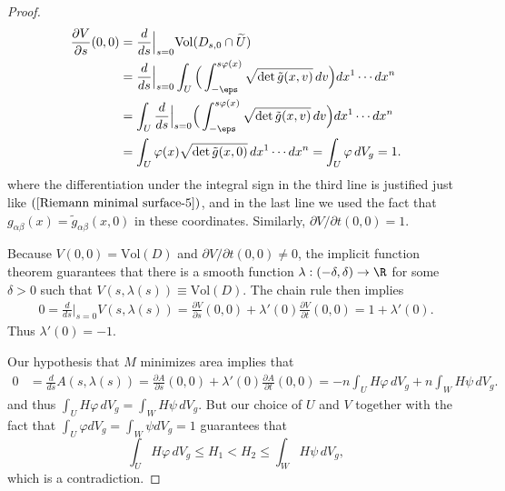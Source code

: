 \begin{proof}
\begin{align*}
\frac{\partial V}{\partial s}(0,0)&=\frac{d}{ds}\Big|_{s=0}\mathrm{Vol}(D_{s,0}\cap\widetilde{U})\\
&=\frac{d}{ds}\Big|_{s=0}\int_U\Big(\int_{-\eps}^{s\varphi(x)}\sqrt{\det\tilde{g}(x,v)}\,dv\Big)dx^1\cdots dx^n\\
&=\int_U\frac{d}{ds}\Big|_{s=0}\Big(\int_{-\eps}^{s\varphi(x)}\sqrt{\det\tilde{g}(x,v)}\,dv\Big)dx^1\cdots dx^n\\
&=\int_U\varphi(x)\sqrt{\det\tilde{g}(x,0)}\,dx^1\cdots dx^n=\int_U\varphi\,dV_g=1.
\end{align*}
where the differentiation under the integral sign in the third line is justified just like $(\ref{Riemann minimal surface-5})$, and in the last line we used the fact that $g_{\alpha\beta}(x)=\tilde{g}_{\alpha\beta}(x,0)$ in these coordinates. Similarly, $\partial V/\partial t(0,0)=1$.\par
Because $V(0,0)=\mathrm{Vol}(D)$ and $\partial V/\partial t(0,0)\neq 0$, the implicit function theorem guarantees that there is a smooth function $\lambda:(-\delta,\delta)\to\R$ for some $\delta>0$ such that $V(s,\lambda(s))\equiv\mathrm{Vol}(D)$. The chain rule then implies
\begin{align*}
0=\frac{d}{ds}\Big|_{s=0}V(s,\lambda(s))=\frac{\partial V}{\partial s}(0,0)+\lambda'(0)\frac{\partial V}{\partial t}(0,0)=1+\lambda'(0).
\end{align*}
Thus $\lambda'(0)=-1$.\par
Our hypothesis that $M$ minimizes area implies that
\begin{align*}
0&=\frac{d}{ds}A(s,\lambda(s))=\frac{\partial A}{\partial s}(0,0)+\lambda'(0)\frac{\partial A}{\partial t}(0,0)=-n\int_UH\varphi\,dV_g+n\int_WH\psi\,dV_g.
\end{align*}
and thus $\int_UH\varphi\,dV_g=\int_WH\psi\,dV_g$. But our choice of $U$ and $V$ together with the fact that $\int_U\varphi dV_g=\int_W\psi dV_g=1$ guarantees that 
\[\int_UH\varphi\,dV_g\leq H_1<H_2\leq\int_WH\psi\,dV_g,\]
which is a contradiction.
\end{proof}

